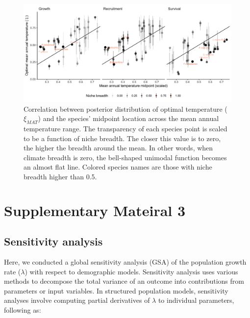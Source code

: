 \newpage

\hypertarget{fig:figsupp11_ch2}{%
\begin{figure}
\centering
\includegraphics{manuscript/figs/temp_optimal_rangeLocation.png}
\caption[{Correlation between posterior distribution of optimal
temperature (\(\xi_{MAT}\)) and the species' midpoint location across
the mean annual temperature range.}]{Correlation between posterior
distribution of optimal temperature (\(\xi_{MAT}\)) and the species'
midpoint location across the mean annual temperature range. The
transparency of each species point is scaled to be a function of niche
breadth. The closer this value is to zero, the higher the breadth around
the mean. In other words, when climate breadth is zero, the bell-shaped
unimodal function becomes an almost flat line. Colored species names are
those with niche breadth higher than 0.5.}
\label{fig:figsupp11_ch2}
\end{figure}
}

\newpage

\hypertarget{supplementary-mateiral-3}{%
\section{Supplementary Mateiral 3}\label{supplementary-mateiral-3}}

\hypertarget{sensitivity-analysis}{%
\subsection{Sensitivity analysis}\label{sensitivity-analysis}}

Here, we conducted a global sensitivity analysis (GSA) of the population
growth rate (\(\lambda\)) with respect to demographic models.
Sensitivity analysis uses various methods to decompose the total
variance of an outcome into contributions from parameters or input
variables. In structured population models, sensitivity analyses involve
computing partial derivatives of \(\lambda\) to individual parameters,
following \citet{Caswell1978} as:\\


